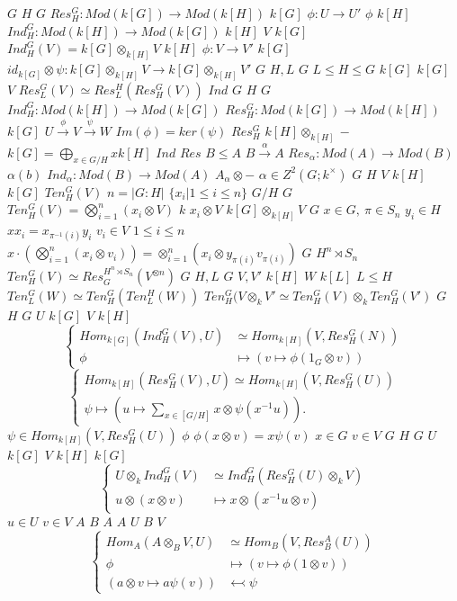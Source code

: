 \documentclass{article}
\begin{document}
$G$
$H$
$G$
$Res_H^G:Mod(k[G]) \rightarrow Mod(k[H])$
$k[G]$
$\phi:U \rightarrow U'$
$\phi$
$k[H]$
$Ind_H^G:Mod(k[H]) \rightarrow Mod(k[G])$
$k[H]$
$V$
$k[G]$
$Ind_H^G(V)=k[G] \otimes_{k[H]}V$
$k[H]$
$\phi:V \rightarrow V'$
$k[G]$
$id_{k[G]} \otimes \psi:k[G] \otimes_{k[H]}V \rightarrow k[G] \otimes_{k[H]} V'$
$G$
$H,L$
$G$
$L \leq H \leq G$
$k[G]$
$k[G]$
$V$
$Res_L^{G}(V) \simeq Res_{L}^{H}(Res_H^G(V))$
$Ind$
$G$
$H$
$G$
$Ind_H^G:Mod(k[H]) \rightarrow Mod(k[G])$
$Res_H^G:Mod(k[G]) \rightarrow Mod(k[H])$
$k[G]$
$U \stackrel{\phi}{\longrightarrow} V \stackrel{\psi}{\longrightarrow} W$
$Im(\phi)=ker(\psi)$
$Res_H^G$
$k[H] \otimes_{k[H]} -$
$k[G]=\bigoplus_{x \in G/H}xk[H]$
$Ind$
$Res$
$B \leq A$
$B \stackrel{\alpha}{\longrightarrow} A$
$Res_\alpha:Mod(A) \rightarrow Mod(B)$
$\alpha(b)$
$Ind_\alpha:Mod(B) \rightarrow Mod(A)$
$A_\alpha \otimes -$
$\alpha \in Z^2(G;k^\times)$
$G$
$H$
$V$
$k[H]$
$k[G]$
$Ten_H^G(V)$
$n=|G:H|$
$\{x_i|1\leq i \leq n\}$
$G/H$
$G$
$Ten_H^G(V)=\bigotimes_{i=1}^n(x_i \otimes V)$
$k$
$x_i \otimes V$
$k[G] \otimes_{k[H]}V$
$G$
$x \in G,\ \pi \in S_n$
$y_i \in H$
$xx_i=x_{\pi^{-1}(i)}y_i$
$v_i \in V$
$1 \leq i \leq n$
$x \cdot (\bigotimes_{i=1}^n(x_i \otimes v_i))=\otimes_{i=1}^n(x_i \otimes y_{\pi(i)}v_{\pi(i)})$
$G$
$H^n \rtimes S_n$
$Ten_H^G(V)\simeq Res_G^{H^n \rtimes S_n}(V^{\otimes n})$
$G$
$H,L$
$G$
$V,V'$
$k[H]$
$W$
$k[L]$
$L \leq H$
$Ten^G_L(W) \simeq Ten_H^G(Ten_L^H(W))$
$Ten_H^G(V \otimes_k V'\simeq Ten_H^G(V) \otimes_k Ten_H^G(V')$
$G$
$H$
$G$
$U$
$k[G]$
$V$
$k[H]$
$$
\begin{cases}Hom_{k[G]}(Ind_H^G(V), U) &\simeq Hom_{k[H]}(V,Res_H^G(N))\\
\phi &\mapsto (v \mapsto \phi(1_G \otimes v))\end{cases}
$$
$$
\begin{cases}
Hom_{k[H]}(Res_H^G(V),U) \simeq Hom_{k[H]}(V,Res_H^G(U))\\
\psi \mapsto (u \mapsto \sum_{x \in [G/H]}x \otimes \psi (x^{-1}u)).
\end{cases}
$$
$\psi \in Hom_{k[H]}(V,Res_H^G(U))$
$\phi$
$\phi(x \otimes v) = x\psi (v)$
$x \in G$
$v \in V$
$G$
$H$
$G$
$U$
$k[G]$
$V$
$k[H]$
$k[G]$
$$
\begin{cases}U \otimes_k Ind_{H}^G(V) &\simeq Ind_H^G(Res_H^G(U) \otimes_kV)\\
u \otimes (x \otimes v) &\mapsto x \otimes (x^{-1}u \otimes v)
\end{cases}
$$
$u \in U$
$v \in V$
$A$
$B$
$A$
$A$
$U$
$B$
$V$
$$
\begin{cases}
Hom_A(A \otimes_BV,U) &\simeq Hom_B(V,Res_B^A(U))\\
\phi &\mapsto (v \mapsto \phi(1 \otimes v))\\
(a \otimes v \mapsto a \psi(v)) &\leftarrowtail \psi
\end{cases}
$$
\end{document}
